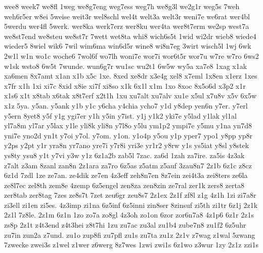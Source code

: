 {wee8
week7
we8fl
1weg
we8g7eng
weg7ess
weg7h
we8g3l
we2g1r
weg5s
7weh
weh6r5er
w8ei
5weise
weit3r
wel8schl
wel4t
welt3a
welt3r
weni7e
we6rat
wer4bl
5werdu
wer4fl
5werk.
wer8ka
werk7erz
wer8ku
wer4ta
wer8t7erm
we2sp
west7a
we8st7end
we8steu
we8st7r
7wett
wet8ta
whi8
wich6s5t
1wid
wi2dr
wieb8
wiede4
wieder5
8wiel
wik6
7wil
wim6ma
win6d5r
wine8
wi8n7eg
3wirt
wisch5l
1wj
6wk
2w1l
w1n
wo1c
woche6
7wol6f
wo7lh
woni7e
wor7i
wor6t5r
wor7u
w7re
w7ro
6ws2
w1sk
wsto8
6w5t
7wunde.
wun6g7r
wu1sc
wu2t1
6w5w
wy5a
xa7e8
1xag
x1ak
xa6men
8x7amt
x1an
x1b
x5c
1xe.
8xed
xe8dr
x3e4g
xel8
x7eml
1x8en
x1erz
1xes
x7fr
x1h
1xi
xi7c
8xid
x8ie
xi7f
xi8so
x1k
6x1l
x1m
1xo
8xoc
8x5o6d
x3p2
x1r
x1s6
x1t
x8tab
x6tak
x8t7erf
x2t1h
1xu
xu7alt
xu7alv
xu1e
x5ul
x7u8v
x5v
6x5w
x1z
5ya.
y5an.
y5ank
y1b
y1c
y6cha
y4chia
ycho7
y1d
y8dep
yen6n
y7er.
y7erl
y5ern
8yet8
y5f
y1g
ygi7er
y1h
y5in
y7ist.
y1j
y1k2
yki7e
y5lad
y1lak
yl1al
yl7a8m
yl7ar
y5lax
y1le
yli8k
yli8n
y7l8o
y5lu
ym1p2
ympi7e
y5mu
y1na
yn7d8
yni7e
yno2d
yn1t
y7oi
y7ol.
y7om.
y1on.
y1o4p
y5ou
y1p
yper7
ypo1
y8pp
yp8r
y2ps
y2pt
y1r
yra8n
yr7ano
yre7i
y7r8i
yri3e
yr1r2
y8rw
y1s
ys5iat
y8sl
y8stek
ys8ty
ysu8
y1t
y7vi
y3w
y1z
6z1a2b
zab5l
7zac.
za6d
1zah
za7ire.
za5is
4z3ak
z7alt
z3am
8zanl
zan8n
2z1ara
za7ro
6z5as
z5atm
z5auf
3zau8n7
2z1b
6z1c
z8cz
6z1d
7zdl
1ze
ze7an.
ze4dik
ze7en
4z3eff
zeh8n7en
8z7ein
zei4t3a
zei8ters
ze6la
ze8l7ec
zel8th
zem8e
4zemp
6z5engel
zen8za
zen8zin
ze7ral
zer1k
zers8
zerta8
zer8tab
zer8tag
7zes
ze8s7t
7zet
zeu6gr
zeu8s7
2z1ex
2z1f
zf8l
z1g
4z1h
1zi
zi7a8r
zi3ell
zi1en
zi5es.
4z3imp
zi1na
6z5inf
6z5inni
zin8ser
8zinsuf
zi5th
zi1tr
6z1j
2z1k
2z1l
7z8le.
2z1m
6z1n
1zo
zo7a
zo8gl
4z3oh
zo1on
6zor
zor6n7a8
4z1p6
6z1r
2z1s
zs8p
2z1t
z4t3end
z4t3hei
z8t7hi
1zu
zu7ac
zu3al
zu1b4
zube7n8
zu1f2
6z5uhr
zu7in
zun2a
z7und.
zu1o
zup8fi
zu7pfl
zu1s
zu7ta
zu1z
2z1v
z7wag
z1wal
5zwang
7zwecke
zwei3s
z1wel
z1wer
z6werg
8z7wes
1zwi
zwi1s
6z1wo
z3wur
1zy
2z1z
zzi1s}
